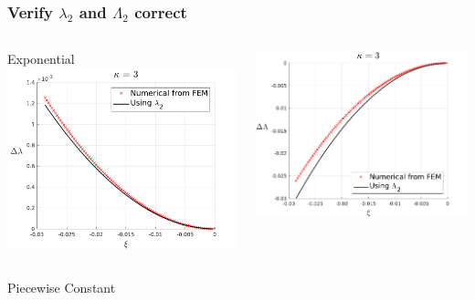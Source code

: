 \documentclass{beamer}
\begin{document}
\begin{frame}
	\frametitle{\large Verify $\lambda_2$ and $\Lambda_2$ correct}
	\begin{columns}
		 \footnotesize \center Exponential
		\center \includegraphics[width =\textwidth]{myFigures/lambdaCheck_exp_1}
		
				\center \includegraphics[width = \textwidth]{myFigures/lambdaCheck_exp_2}
	\end{columns}

	\begin{columns}
		 \footnotesize \center Piecewise Constant
	

\end{columns}
\end{frame}
\end{document}
